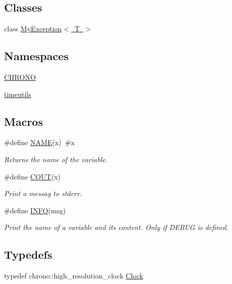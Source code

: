 \subsection*{Classes}
\begin{DoxyCompactItemize}
\item 
class \mbox{\hyperlink{class_my_exception}{My\+Exception$<$ T $>$}}
\end{DoxyCompactItemize}
\subsection*{Namespaces}
\begin{DoxyCompactItemize}
\item 
 \mbox{\hyperlink{namespace_c_h_r_o_n_o}{C\+H\+R\+O\+NO}}
\item 
 \mbox{\hyperlink{namespacetimeutils}{timeutils}}
\end{DoxyCompactItemize}
\subsection*{Macros}
\begin{DoxyCompactItemize}
\item 
\#define \mbox{\hyperlink{utils_8hh_a14111ac8f43949172b152e50dc720aba}{N\+A\+ME}}(x)~\#x
\begin{DoxyCompactList}\small\item\em Returns the name of the variable. \end{DoxyCompactList}\item 
\#define \mbox{\hyperlink{utils_8hh_a051dcff3fa35db18fbabb4fde1bd1167}{C\+O\+UT}}(x)
\begin{DoxyCompactList}\small\item\em Print a messag to stderr. \end{DoxyCompactList}\item 
\#define \mbox{\hyperlink{utils_8hh_a3ae64706314066fdc8b6c8029a915aa7}{I\+N\+FO}}(msg)
\begin{DoxyCompactList}\small\item\em Print the name of a variable and its content. Only if D\+E\+B\+UG is defined. \end{DoxyCompactList}\end{DoxyCompactItemize}
\subsection*{Typedefs}
\begin{DoxyCompactItemize}
\item 
typedef chrono\+::high\+\_\+resolution\+\_\+clock \mbox{\hyperlink{utils_8hh_af5fd44b7ee78ceeb4a0e869179f422f7}{Clock}}
\end{DoxyCompactItemize}
